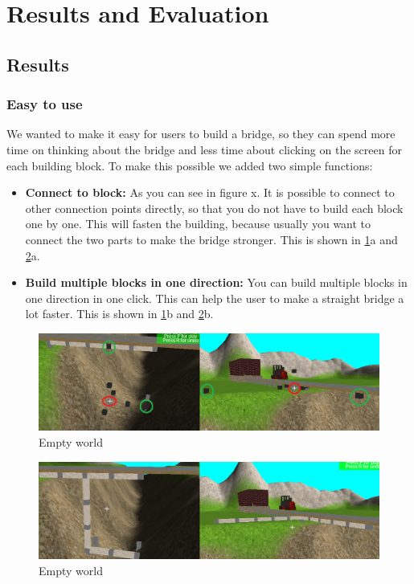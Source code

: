 \section{Results and Evaluation}
\subsection{Results}
\subsubsection{Easy to use}
We wanted to make it easy for users  to build a bridge, so they can spend more time on thinking about the bridge and less time about clicking on the screen for each building block.  To make this possible we added two simple functions:\\
\begin{itemize}
\item \textbf{Connect to block:}
As you can see in figure x. It is possible to connect to other connection points directly, so that you do not have to build each block one by one. This will fasten the building, because usually you want to connect the two parts to make the bridge stronger. This is shown in \ref{fig:easyu1}a and \ref{fig:easyu2}a.
\item \textbf{Build multiple blocks in one direction:}
You can build multiple blocks in one direction in one click. This can help the user to make a straight bridge a lot faster. This is shown in \ref{fig:easyu1}b and \ref{fig:easyu2}b.
\end{itemize}
\begin{figure}[H]
    \centering
    \includegraphics[width=1.0\textwidth]{screenshots/easyuse1.png}
    \caption{Empty world}
    \label{fig:easyu1}
\end{figure}
\begin{figure}[H]
    \centering
    \includegraphics[width=1.0\textwidth]{screenshots/easyuse2.png}
    \caption{Empty world}
    \label{fig:easyu2}
\end{figure}
